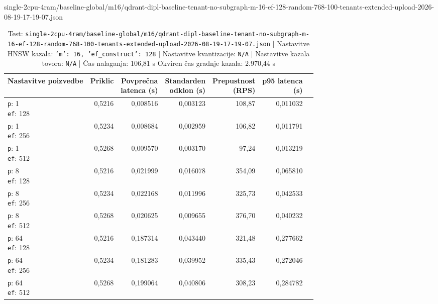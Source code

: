 \begin{table}[htbp]
  \centering
\small
  \caption{single-2cpu-4ram/baseline-global/m16/qdrant-dipl-baseline-tenant-no-subgraph-m-16-ef-128-random-768-100-tenants-extended-upload-2026-08-19-17-19-07.json}
  \label{tab:single-2cpu-4ram:baseline-global:m16:qdrant-dipl-baseline-tenant-no-subgraph-m-16-ef-128-random-768-100-tenants-extended-upload-2026-08-19-17-19-07.json}
  \begin{tabularx}{\textwidth}{Xrrrrrr}
    \toprule
    Nastavitve poizvedbe & Priklic & \makecell{Povprečna\\latenca (s)} & \makecell{Standarden\\odklon (s)} & \makecell{Prepustnost\\(RPS)} & \makecell{p95 latenca\\(s)}  \\
    \midrule
    \makecell{\texttt{p}: 1\\\texttt{ef}: 128} & 0,5216 & 0,008516 & 0,003123 & 108,87 & 0,011032 \\
    \makecell{\texttt{p}: 1\\\texttt{ef}: 256} & 0,5234 & 0,008684 & 0,002959 & 106,82 & 0,011791 \\
    \makecell{\texttt{p}: 1\\\texttt{ef}: 512} & 0,5268 & 0,009570 & 0,003170 & 97,24 & 0,013219 \\
    \makecell{\texttt{p}: 8\\\texttt{ef}: 128} & 0,5216 & 0,021999 & 0,016078 & 354,09 & 0,065810 \\
    \makecell{\texttt{p}: 8\\\texttt{ef}: 256} & 0,5234 & 0,022168 & 0,011996 & 325,73 & 0,042533 \\
    \makecell{\texttt{p}: 8\\\texttt{ef}: 512} & 0,5268 & 0,020625 & 0,009655 & 376,70 & 0,040232 \\
    \makecell{\texttt{p}: 64\\\texttt{ef}: 128} & 0,5216 & 0,187314 & 0,043440 & 321,48 & 0,277662 \\
    \makecell{\texttt{p}: 64\\\texttt{ef}: 256} & 0,5234 & 0,181283 & 0,039952 & 335,43 & 0,272046 \\
    \makecell{\texttt{p}: 64\\\texttt{ef}: 512} & 0,5268 & 0,199064 & 0,040806 & 308,23 & 0,284782 \\
    \bottomrule
  \end{tabularx}
\caption* {Test: \texttt{single-2cpu-4ram/baseline-global/m16/qdrant-dipl-baseline-tenant-no-subgraph-m-16-ef-128-random-768-100-tenants-extended-upload-2026-08-19-17-19-07.json} | Nastavitve HNSW kazala: \texttt{{'m': 16, 'ef\_construct': 128}} | Nastavitve kvantizacije: \texttt{N/A} | Nastavitve kazala tovora: \texttt{N/A} | Čas nalaganja: 106,81 s Okviren čas gradnje kazala: 2.970,44 s}\end{table}


